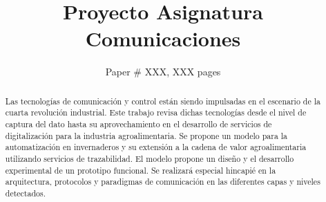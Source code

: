 \documentclass[sigconf]{acmart}
\begin{document}
\title{Proyecto Asignatura Comunicaciones}


\author{Paper \# XXX, XXX pages}

\renewcommand{\shortauthors}{X.et al.}

\begin{abstract}
Las tecnologías de comunicación y control están siendo impulsadas en el escenario de la cuarta revolución industrial. Este trabajo revisa dichas tecnologías desde el nivel de captura del dato  hasta su aprovechamiento en el desarrollo de servicios de digitalización para la industria agroalimentaria. Se propone un modelo para la automatización en invernaderos y su extensión a la cadena de valor agroalimentaria utilizando servicios de trazabilidad. El modelo propone un diseño y el desarrollo experimental de un prototipo funcional. Se realizará especial hincapié en la arquitectura, protocolos y paradigmas de comunicación en las diferentes capas y niveles detectados.

\end{abstract}

\maketitle





\end{document}
